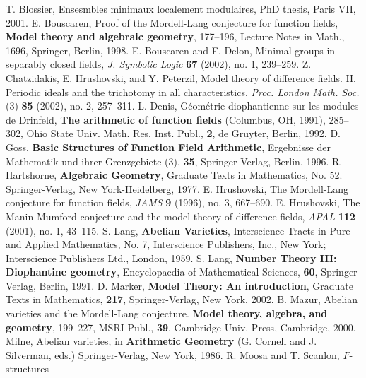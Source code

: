 \documentclass{amsart}
\theoremstyle{definition}
\theoremstyle{remark}
\begin{document}
\begin{thebibliography}{99}

  {\sc T. Blossier}, Ensesmbles minimaux localement modulaires, PhD thesis, Paris VII, 2001.
  {\sc E. Bouscaren}, Proof of the Mordell-Lang conjecture for function fields,
{\bf  Model theory and algebraic geometry}, 177--196, Lecture Notes in Math., 1696, Springer, Berlin, 1998.
  {\sc E. Bouscaren} and {\sc F. Delon}, Minimal groups in separably closed fields, 
\emph{J. Symbolic Logic} {\bf 67} (2002), no. 1, 239--259.
 {\sc Z. Chatzidakis}, {\sc E. Hrushovski}, and {\sc Y. Peterzil}, Model theory of difference fields. II.
 Periodic ideals and the trichotomy in all characteristics, \emph{Proc. London Math. Soc.} (3) {\bf 85} 
 (2002), no. 2, 257--311.
 {\sc L. Denis}, G\'{e}om\'{e}trie diophantienne sur les modules de Drinfeld, 
{\bf The arithmetic of function fields} (Columbus, OH, 1991), 285--302, Ohio State Univ. Math. Res. Inst. Publ.,
 {\bf 2}, de Gruyter, Berlin, 1992. 
 {\sc D. Goss}, {\bf Basic Structures of Function Field Arithmetic},
 Ergebnisse der Mathematik und ihrer Grenzgebiete (3), {\bf 35}, Springer-Verlag, Berlin, 1996.
 {\sc R. Hartshorne}, {\bf Algebraic Geometry}, Graduate Texts in Mathematics, No. 52. Springer-Verlag, New York-Heidelberg, 1977.
 {\sc E. Hrushovski}, The Mordell-Lang conjecture for function fields,
 \emph{JAMS} {\bf 9} (1996), no. 3, 667--690. 
 {\sc E. Hrushovski}, The Manin-Mumford conjecture and the model theory of difference fields,
\emph{APAL} {\bf 112} (2001), no. 1, 43--115. 
 {\sc S. Lang}, {\bf Abelian Varieties}, Interscience Tracts in Pure and Applied Mathematics, No. 7, 
Interscience Publishers, Inc., New York; Interscience Publishers Ltd., London, 1959. 
 {\sc S. Lang}, {\bf Number Theory III:  Diophantine geometry},
 Encyclopaedia of Mathematical Sciences, {\bf 60}, Springer-Verlag, Berlin, 1991.
 {\sc D. Marker}, {\bf Model Theory: An introduction}, Graduate Texts in Mathematics, {\bf 217},
Springer-Verlag, New York, 2002.
 {\sc B. Mazur}, Abelian varieties and the Mordell-Lang conjecture. 
{\bf Model theory, algebra, and geometry}, 199--227, MSRI Publ., {\bf 39}, Cambridge Univ. Press, Cambridge, 2000. 
 {\sc Milne}, Abelian varieties, in {\bf Arithmetic Geometry} (G. Cornell and J. Silverman, eds.) 
Springer-Verlag, New York, 1986.
 {\sc R. Moosa} and {\sc T. Scanlon}, $F$-structures

\end{thebibliography}
\end{document}
